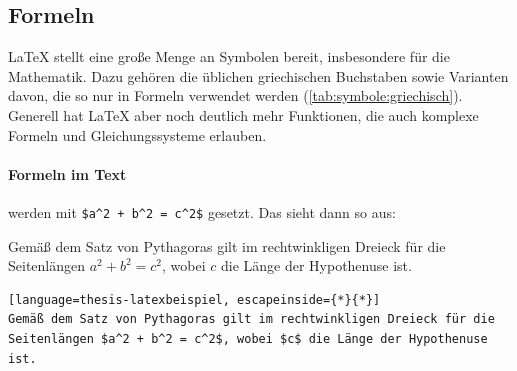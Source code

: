 		\subsection{Formeln}
			\LaTeX{} stellt eine große Menge an Symbolen bereit, insbesondere für die Mathematik.
			Dazu gehören die üblichen griechischen Buchstaben sowie Varianten davon, die so nur in Formeln verwendet werden (\autoref{tab:symbole:griechisch}). 
			Generell hat \LaTeX{} aber noch deutlich mehr Funktionen, die auch komplexe Formeln und Gleichungssysteme erlauben.
			
			\paragraph{Formeln im Text}
				werden mit \lstinline|$a^2 + b^2 = c^2$| gesetzt.
				Das sieht dann so aus:
				\begin{vorlagenbeispiel}
					Gemäß dem Satz von Pythagoras gilt im rechtwinkligen Dreieck für die Seitenlängen $a^2 + b^2 = c^2$, wobei $c$ die Länge der Hypothenuse ist.
				\end{vorlagenbeispiel}
				\begin{lstlisting}[language=thesis-latexbeispiel, escapeinside={*}{*}]
Gemäß dem Satz von Pythagoras gilt im rechtwinkligen Dreieck für die Seitenlängen $a^2 + b^2 = c^2$, wobei $c$ die Länge der Hypothenuse ist.
				\end{lstlisting}
			
